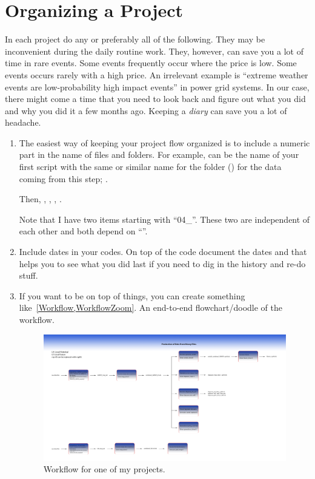 \chapter{Organizing a Project}
\label{chap:OrganizingaProject}


In each project do any or preferably all of 
the following. They may be inconvenient during
the daily routine work. They, however, can save you 
a lot of time in rare events. Some events
frequently occur where the price is low. Some events
occurs rarely with a high price.
An irrelevant example is ``extreme weather events are 
low-probability high impact events'' in power grid systems.
In our case, there might come a time that you need
to look back and figure out what you did and why you did
it a few months ago. Keeping a \emph{diary} can save you 
a lot of headache.
\begin{enumerate}
\item The easiest way of keeping your project flow organized is to 
include a numeric part in the name of files and folders.
For example,  can be the name
of your first script with the same or similar name for the folder 
() for the data coming from this step; . 

Then, ,
, ,
.

Note that I have two items starting with ``04\_''. 
These two are independent of each other
and both depend on ``''.

\item Include dates in your codes. On top of the code
document the dates and that helps you to see what you did last
if you need to dig in the history and re-do stuff.

\item If you want to be on top of things, you can create 
something like~\cref{Workflow,WorkflowZoom}. An end-to-end 
flowchart/doodle of the workflow.

\begin{figure}[htb]
  \centering
  \includegraphics[width=1\textwidth]{figures/pipe_Line}
  \caption{Workflow for one of my projects.}
  \label{Workflow}
\end{figure}


\end{enumerate}
